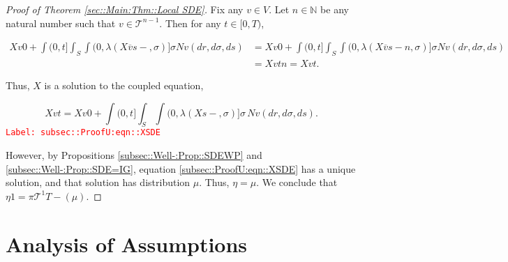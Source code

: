 \documentclass[12pt]{article}
\newcommand{\mb}{\mathbb}
\newcommand{\mc}{\mathcal}
\newcommand{\ov}{\overline}
\newcommand{\tr}{\textcolor{red}}
\newcommand{\labe}[1]{\tr{\texttt{Label: #1}}}
\newcommand{\ind}{\hspace{24pt}}
\renewcommand{\v}{v}							%
\renewcommand{\S}{S}							%
\newcommand{\s}{\sigma}							%
\newcommand{\T}{T}								%
\renewcommand{\t}{t}							%
\newcommand{\proj}{\pi}							%
\renewcommand{\tt}{s}							%
\newcommand{\X}{X}								%
\newcommand{\cl}{\ov}							%
\newcommand{\tree}{\mc{T}}						%
\newcommand{\sln}[1]{^{#1}}						%
\newcommand{\poiss}{N}							%
\newcommand{\rate}{\lambda}						%
\renewcommand{\r}{r}							%
\newcommand{\m}{\mu}							%
\newcommand{\mmm}{\eta}							%
\begin{document}
\begin{proof}[Proof of Theorem \ref{sec::Main:Thm::Local SDE}]
\ind Fix any \(\v\in V\). Let \(n\in \mb{N}\) be any natural number such that \(\v\in \tree\sln{n-1}\). Then for any \(\t \in [0,\T)\),

\begin{align*}
\X{\v}{0} + \int{(0,\t]}\int_\S\int{(0,\rate{}(\X{\cl{\v}}{\tt-},\s)]}\s\poiss{\v}(d\r,d\s,d\tt) &= \X{\v}{0} + \int{(0,\t]}\int_\S\int{(0,\rate{}(\X{\cl{\v}}{\tt-}{n},\s)]}\s\poiss{\v}(d\r,d\s,d\tt)\\
&=\X{\v}{\t}{n} = \X{\v}{\t}.
\end{align*}

Thus, \(\X{}{}\) is a solution to the coupled equation,

\begin{equation}
\X{\v}{\t} = \X{\v}{0} + \int{(0,\t]}\int_\S \int{(0,\rate{}(\X{}{\tt-},\s)]}\s\,\poiss{\v}(d\r,d\s,d\tt).
\label{subsec::ProofU:eqn::XSDE}
\end{equation}
\labe{subsec::ProofU:eqn::XSDE}

However, by Propositions \ref{subsec::Well-:Prop::SDEWP} and \ref{subsec::Well-:Prop::SDE=IG}, equation \eqref{subsec::ProofU:eqn::XSDE} has a unique solution, and that solution has distribution \(\m{}{}{}\). Thus, \(\mmm{}{}{} = \m{}{}{}\). We conclude that \(\mmm{}{}{1} = \proj{\tree\sln{1}}{\T-}(\m{}{}{})\).

\end{proof}

\section{Analysis of Assumptions}
\end{document}
